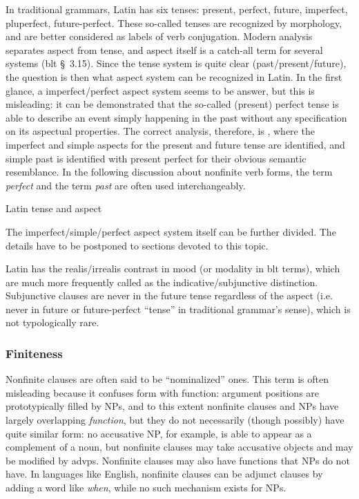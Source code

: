 \documentclass{article}
\newcommand*{\citesec}[1]{\S~{#1}}
\newcommand*{\term}[1]{\emph{#1}}
\newcommand*{\corpus}[1]{\emph{#1}}
\begin{document}
In traditional grammars, Latin has six tenses:
present, perfect, future, imperfect, pluperfect, future-perfect.
These so-called tenses are recognized by morphology,
and are better considered as labels of verb conjugation.
Modern analysis separates aspect from tense,
and aspect itself is a catch-all term for several systems (\ac{blt} \citesec{3.15}).
Since the tense system is quite clear (past/present/future),
the question is then what aspect system can be recognized in Latin.
In the first glance, a imperfect/perfect aspect system seems to be answer,
but this is misleading:
it can be demonstrated that the so-called (present) perfect tense 
is able to describe an event simply happening in the past without any specification on its aspectual properties.
The correct analysis, therefore, is ,
where the imperfect and simple aspects for the present and future tense are identified,
and simple past is identified with present perfect for their obvious semantic resemblance.
In the following discussion about nonfinite verb forms, 
the term \term{perfect} and the term \term{past} are often used interchangeably.

\begin{table}
    \caption{Latin tense and aspect}
    \label{tbl:latin-tense-aspect}
    \centering
        
\end{table}

The imperfect/simple/perfect aspect system itself can be further divided.
The details have to be postponed to sections devoted to this topic.

Latin has the realis/irrealis contrast in mood (or modality in \ac{blt} terms), 
which are much more frequently called as the indicative/subjunctive distinction.
Subjunctive clauses are never in the future tense regardless of the aspect
(i.e. never in future or future-perfect ``tense'' in traditional grammar's sense),
which is not typologically rare.

\subsubsection{Finiteness}\label{sec:finite-abs}

Nonfinite clauses are often said to be ``nominalized'' ones.
This term is often misleading because it confuses form with function:
argument positions are prototypically filled by NPs,
and to this extent nonfinite clauses and NPs have largely overlapping \emph{function},
but they do not necessarily (though possibly) have quite similar form:
no accusative NP, for example, is able to appear as a complement of a noun,
but nonfinite clauses may take accusative objects and may be modified by \ac{advp}s.
Nonfinite clauses may also have functions that NPs do not have.
In languages like English, nonfinite clauses can be adjunct clauses by adding a word like \corpus{when},
while no such mechanism exists for NPs.
\end{document}
